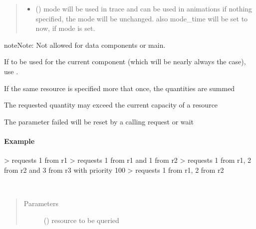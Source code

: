 \documentclass[letterpaper,10pt,english]{sphinxmanual}
\begin{document}
\begin{fulllineitems}
\begin{fulllineitems}
\begin{quote}
\begin{description}
\begin{itemize}
\item {} 
 () \textendash{} mode 
will be used in trace and can be used in animations 
if nothing specified, the mode will be unchanged. 
also mode\_time will be set to now, if mode is set.

\end{itemize}

\end{description}\end{quote}

\begin{sphinxadmonition}{note}{Note:}
Not allowed for data components or main.

If to be used for the current component
(which will be nearly always the case),
use .

If the same resource is specified more that once, the quantities are summed 

The requested quantity may exceed the current capacity of a resource 

The parameter failed will be reset by a calling request or wait
\end{sphinxadmonition}
\paragraph{Example}

\textendash{}\textgreater{} requests 1 from r1 
\textendash{}\textgreater{} requests 1 from r1 and 1 from r2 
\textendash{}\textgreater{} requests 1 from r1, 2 from r2 and 3 from r3 with priority 100 
\textendash{}\textgreater{} requests 1 from r1, 2 from r2 

\end{fulllineitems}


\begin{fulllineitems}
\label{\detokenize{Reference:salabim.Component.requested_quantity}}~\begin{quote}\begin{description}
\item[{Parameters}] \leavevmode
{} () \textendash{} resource to be queried


\end{description}
\end{quote}
\end{fulllineitems}
\end{fulllineitems}
\end{document}
